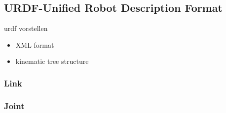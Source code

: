 \subsection{URDF-Unified Robot Description Format}
urdf vorstellen

\begin{itemize}
\item XML format
\item kinematic tree structure
\end{itemize}

\subsubsection*{Link}

\subsubsection*{Joint}

